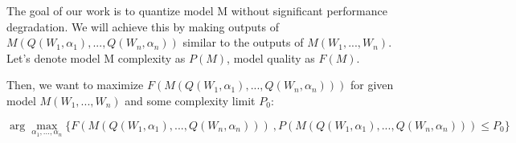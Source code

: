 \documentclass{article}
\begin{document}
The goal of our work is to quantize model M without significant performance degradation. We will achieve this by making  outputs of $M(Q(W_1, \alpha_1), ..., Q(W_n, \alpha_n))$ similar to the outputs of $M(W_1, ..., W_n )$.
Let's denote model M complexity as $P(M)$, model quality as $F(M)$.

Then, we want to maximize $F(M(Q(W_1, \alpha_1), ..., Q(W_n, \alpha_n))) $  for given model $M(W_1, ..., W_n)$ and some complexity limit $P_0$:

$\arg\max\limits_{\alpha_1, ..., \alpha_n} \{F(M(Q(W_1, \alpha_1), ..., Q(W_n, \alpha_n)))\ , P(M(Q(W_1, \alpha_1), ..., Q(W_n, \alpha_n))) \leq P_0\}$








\end{document}

